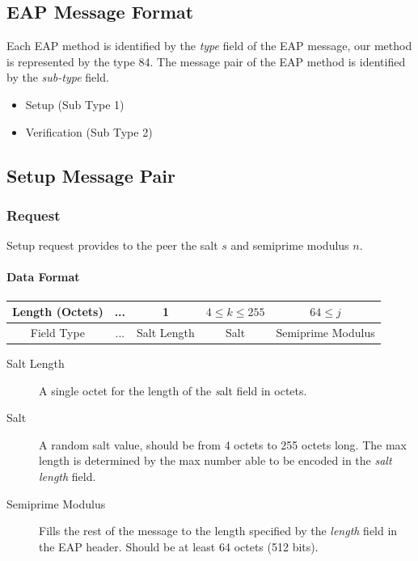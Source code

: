\newpage
\subsection{EAP Message Format}
Each EAP method is identified by the \textit{type} field of the EAP message, our method is represented by the type 84.
The message pair of the EAP method is identified by the \textit{sub-type} field.

\begin{itemize}
	\item Setup (Sub Type 1)
	\item Verification (Sub Type 2)
\end{itemize}

\subsection{Setup Message Pair}

%

\subsubsection{Request} Setup request provides to the peer the salt $s$ and semiprime modulus $n$.

\paragraph{Data Format}

\begin{center}
\begin{tabular}{|c|c|c|c|c|}
	\hline
	Length (Octets) & ... & 1 & $4 \le k \le 255 $ & $64 \le j$\\
	\hline
	Field Type & ... & Salt Length & Salt & Semiprime Modulus\\
	\hline
\end{tabular}
\end{center}

\begin{description}
	\item[Salt Length] A single octet for the length of the \textit salt field in octets.
	\item[Salt] A random salt value, should be from 4 octets to 255 octets long.
The max length is determined by the max number able to be encoded in the \textit {salt length} field.
	\item[Semiprime Modulus] Fills the rest of the message to the length specified by the \textit{length} field in the EAP header. %
Should be at least 64 octets (512 bits).
\end{description}

